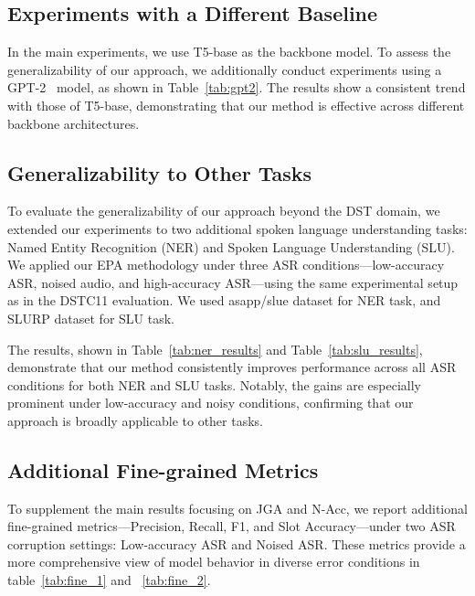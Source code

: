 \subsection{Experiments with a Different Baseline}

In the main experiments, we use T5-base as the backbone model. To assess the generalizability of our approach, we additionally conduct experiments using a GPT-2~\cite{gpt2} model, as shown in Table~\ref{tab:gpt2}. The results show a consistent trend with those of T5-base, demonstrating that our method is effective across different backbone architectures.



\subsection{Generalizability to Other Tasks}
\label{app:generalizability}


To evaluate the generalizability of our approach beyond the DST domain, we extended our experiments to two additional spoken language understanding tasks: Named Entity Recognition (NER) and Spoken Language Understanding (SLU). We applied our EPA methodology under three ASR conditions—low-accuracy ASR, noised audio, and high-accuracy ASR—using the same experimental setup as in the DSTC11 evaluation. We used asapp/slue dataset for NER task\cite{asapp}, and  SLURP dataset \cite{slurp} for SLU task.

The results, shown in Table~\ref{tab:ner_results} and Table~\ref{tab:slu_results}, demonstrate that our method consistently improves performance across all ASR conditions for both NER and SLU tasks. Notably, the gains are especially prominent under low-accuracy and noisy conditions, confirming that our approach is broadly applicable to other tasks.



\subsection{Additional Fine-grained Metrics}
\label{appendix:finegrained}

To supplement the main results focusing on JGA and N-Acc, we report additional fine-grained metrics—Precision, Recall, F1, and Slot Accuracy—under two ASR corruption settings: Low-accuracy ASR and Noised ASR. These metrics provide a more comprehensive view of model behavior in diverse error conditions in table~\ref{tab:fine_1} and ~\ref{tab:fine_2}.







